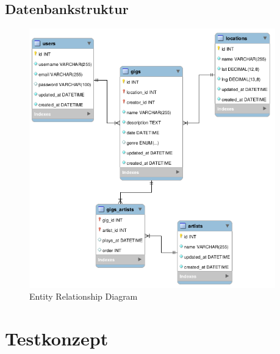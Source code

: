\subsection{Datenbankstruktur}\label{datenbankstruktur}

\begin{figure}[!htb]
  \centering
  \includegraphics[width=0.95\textwidth]{konzept/erd.png}
  \caption{Entity Relationship Diagram}
\end{figure}

\section{Testkonzept}\label{testkonzept}
